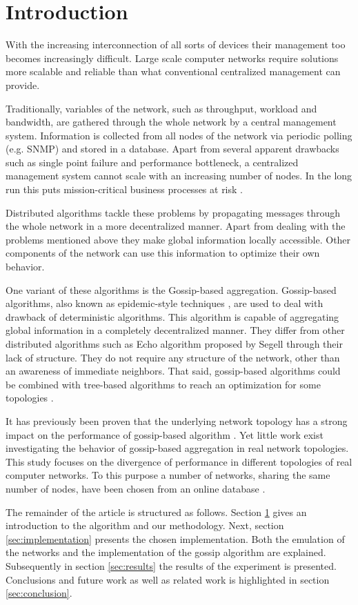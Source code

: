 \section{Introduction}
\label{sec:theory}
With the increasing interconnection of all sorts of devices their management too becomes increasingly difficult. Large scale computer networks require solutions more scalable and reliable than what conventional centralized management can provide.

Traditionally, variables of the network, such as throughput, workload and bandwidth, are gathered through the whole network by a central management system. Information is collected from all nodes of the network via periodic polling (e.g. SNMP) and stored in a database. Apart from several apparent drawbacks such as single point failure and performance bottleneck, a centralized management system cannot scale with an increasing number of nodes. In the long run this puts mission-critical business processes at risk \cite{Stadler529980}.

Distributed algorithms tackle these problems by propagating messages through the whole network in a more decentralized manner. Apart from dealing with the problems mentioned above they make global information locally accessible. Other components of the network can use this information to optimize their own behavior\cite{jelasity_gossip-based_2005}.

One variant of these algorithms is the Gossip-based aggregation. Gossip-based algorithms, also known as epidemic-style techniques \cite{I.Gupta2006}, are used to deal with drawback of deterministic algorithms. This algorithm is capable of aggregating global information in a completely decentralized manner. They differ from other distributed algorithms such as Echo algorithm proposed by Segell \cite{SegallG89} through their lack of structure. They do not require any structure of the network, other than an awareness of immediate neighbors. That said, gossip-based algorithms could be combined with tree-based algorithms to reach an optimization for some topologies \cite{KyasanurCG06}.

It has previously been proven that the underlying network topology has a strong impact on the performance of gossip-based algorithm \cite{5929538, jelasity_gossip-based_2003}. Yet little work exist investigating the behavior of gossip-based aggregation in real network topologies. This study focuses on the divergence of performance in different topologies of real computer networks. To this purpose a number of networks, sharing the same number of nodes, have been chosen from an online database \cite{knight_internet_2011}.

The remainder of the article is structured as follows. Section \ref{sec:theory} gives an introduction to the algorithm and our methodology. Next, section \ref{sec:implementation} presents the chosen implementation. Both the emulation of the networks and the implementation of the gossip algorithm are explained. Subsequently in section \ref{sec:results} the results of the experiment is presented. Conclusions and future work as well as related work is highlighted in section \ref{sec:conclusion}.
